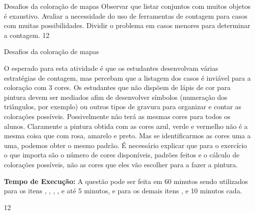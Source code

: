 \begin{objectives}{Desafios da coloração de mapas}
{
Observar que listar conjuntos com muitos objetos é exaustivo. Avaliar a necessidade do uso de ferramentas de contagem para casos com muitas possibilidades. Dividir o problema em casos menores para determinar a contagem.
}{1}{2}
\end{objectives}
\begin{sugestions}{Desafios da coloração de mapas}
{
O esperado para esta atividade é que os estudantes desenvolvam várias estratégias de contagem, mas percebam que a listagem dos casos é inviável para a coloração com 3 cores. Os estudantes que não dispõem de lápis de cor para pintura devem ser mediados afim de desenvolver símbolos (numeração dos triângulos, por exemplo) ou outros tipos de gravura para organizar e contar as colorações possíveis. Possivelmente não terá as mesmas cores para todos os alunos. Claramente a pintura obtida com as  cores azul, verde e vermelho não é a mesma coisa que com rosa, amarelo e preto. Mas se identificarmos as cores uma a uma, podemos obter o mesmo padrão. É necessário explicar  que para o exercício  o que importa são o número de cores disponíveis, padrões feitos e o cálculo de colorações possíveis, não as cores que eles vão escolher para a fazer a pintura.

\textbf{Tempo de Execução:} A questão pode ser feita em 60 minutos sendo utilizados para os itens , , , ,  e  até 5  minutos, e para os demais itens , e  10 minutos cada.
}{1}{2}
\end{sugestions}
